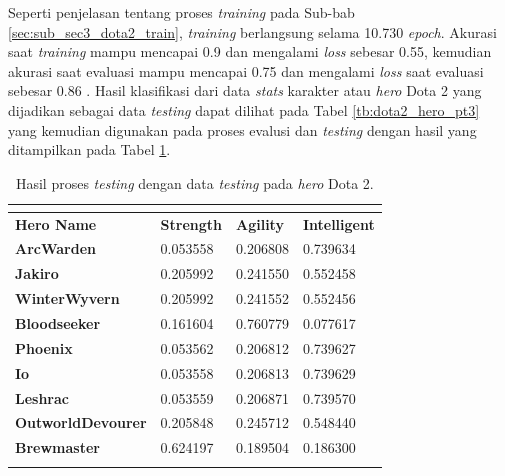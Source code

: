 Seperti penjelasan tentang proses \textit{training} pada Sub-bab \ref{sec:sub_sec3_dota2_train}, \textit{training} berlangsung selama 10.730 \textit{epoch}. Akurasi saat \textit{training} mampu mencapai 0.9 dan mengalami \textit{loss} sebesar 0.55, kemudian akurasi saat evaluasi mampu mencapai 0.75 dan mengalami \textit{loss} saat evaluasi sebesar 0.86 . Hasil klasifikasi dari data \textit{stats} karakter atau \textit{hero} Dota 2 yang dijadikan sebagai data \textit{testing} dapat dilihat pada Tabel \ref{tb:dota2_hero_pt3} yang kemudian digunakan pada proses evalusi dan \textit{testing} dengan hasil yang ditampilkan pada Tabel \ref{tb:dota2_valid_result}.
\vspace{-2ex}

\begin{longtable}{|l|l|l|l|}
	\caption{Hasil proses \textit{testing} dengan data \textit{testing} pada \textit{hero} Dota 2.}
	\vspace{1ex}
	\label{tb:dota2_valid_result}\\
	\hline
	\rowcolor[HTML]{C0C0C0} 
	\textbf{Hero Name} & \textbf{Strength} & \textbf{Agility} & \textbf{Intelligent} \\ \hline
	\rowcolor[HTML]{FFFFFF} 
	\textbf{ArcWarden} & 0.053558 & 0.206808 & {\color[HTML]{FE0000} 0.739634} \\ \hline
	\rowcolor[HTML]{FFFFFF} 
	\textbf{Jakiro} & 0.205992 & 0.241550 & {\color[HTML]{036400} 0.552458} \\ \hline
	\rowcolor[HTML]{FFFFFF} 
	\textbf{WinterWyvern} & 0.205992 & 0.241552 & {\color[HTML]{036400} 0.552456} \\ \hline
	\rowcolor[HTML]{FFFFFF} 
	\textbf{Bloodseeker} & 0.161604 & {\color[HTML]{036400} 0.760779} & 0.077617 \\ \hline
	\rowcolor[HTML]{FFFFFF}
	\textbf{Phoenix} & 0.053562 & 0.206812 & {\color[HTML]{FE0000} 0.739627} \\ \hline
	\rowcolor[HTML]{FFFFFF} 
	\textbf{Io} & 0.053558 & 0.206813 & {\color[HTML]{FE0000} 0.739629} \\ \hline
	\rowcolor[HTML]{FFFFFF} 
	\textbf{Leshrac} & 0.053559 & 0.206871 & {\color[HTML]{036400} 0.739570} \\ \hline
	\rowcolor[HTML]{FFFFFF} 
	\textbf{OutworldDevourer} & 0.205848 & 0.245712 & {\color[HTML]{036400} 0.548440} \\ \hline
	\rowcolor[HTML]{FFFFFF} 
	\textbf{Brewmaster} & {\color[HTML]{036400} 0.624197} & 0.189504 & 0.186300 \\ \hline
	\rowcolor[HTML]{FFFFFF} 

\end{longtable}
